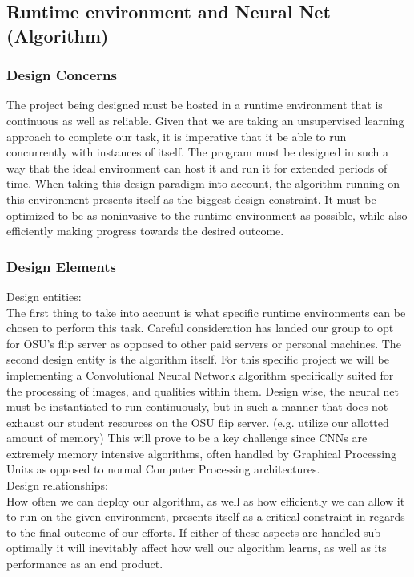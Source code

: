\documentclass[onecolumn, draftclsnofoot,10pt, compsoc]{IEEEtran}
\begin{document}
\subsection{Runtime environment and Neural Net (Algorithm)}
\subsubsection{Design Concerns}
	The project being designed must be hosted in a runtime environment that is continuous as well as reliable. Given that we are taking an unsupervised learning approach to complete our task, it is imperative that it be able to run concurrently with instances of itself. The program must be designed in such a way that the ideal environment can host it and run it for extended periods of time. When taking this design paradigm into account, the algorithm running on this environment presents itself as the biggest design constraint. It must be optimized to be as noninvasive to the runtime environment as possible, while also efficiently making progress towards the desired outcome. 

\subsubsection{Design Elements}
Design entities:\\
	The first thing to take into account is what specific runtime environments can be chosen to perform this task. Careful consideration has landed our group to opt for OSU’s flip server as opposed to other paid servers or personal machines. The second design entity is the algorithm itself. For this specific project we will be implementing a Convolutional Neural Network algorithm specifically suited for the processing of images, and qualities within them. Design wise, the neural net must be instantiated to run continuously, but in such a manner that does not exhaust our student resources on the OSU flip server. (e.g. utilize our allotted amount of memory) This will prove to be a key challenge since CNNs are extremely memory intensive algorithms, often handled by Graphical Processing Units as opposed to normal Computer Processing architectures. \\

	Design relationships:\\
	How often we can deploy our algorithm, as well as how efficiently we can allow it to run on the given environment, presents itself as a critical constraint in regards to the final outcome of our efforts. If either of these aspects are handled sub-optimally it will inevitably affect how well our algorithm learns, as well as its performance as an end product. \\
\end{document}
